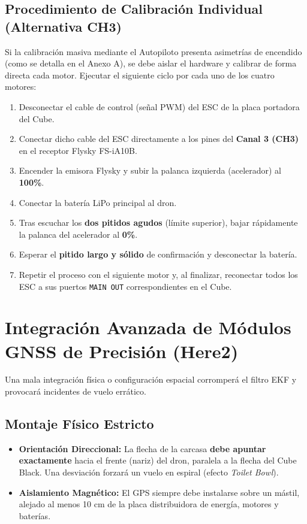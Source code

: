 \documentclass[12pt,a4paper]{article}
\begin{document}
\subsection{Procedimiento de Calibración Individual (Alternativa CH3)}
Si la calibración masiva mediante el Autopiloto presenta asimetrías de encendido (como se detalla en el Anexo A), se debe aislar el hardware y calibrar de forma directa cada motor. Ejecutar el siguiente ciclo por cada uno de los cuatro motores:
\begin{enumerate}[leftmargin=*]
    \item Desconectar el cable de control (señal PWM) del ESC de la placa portadora del Cube.
    \item Conectar dicho cable del ESC directamente a los pines del \textbf{Canal 3 (CH3)} en el receptor Flysky FS-iA10B.
    \item Encender la emisora Flysky y subir la palanca izquierda (acelerador) al \textbf{100\%}.
    \item Conectar la batería LiPo principal al dron.
    \item Tras escuchar los \textbf{dos pitidos agudos} (límite superior), bajar rápidamente la palanca del acelerador al \textbf{0\%}.
    \item Esperar el \textbf{pitido largo y sólido} de confirmación y desconectar la batería.
    \item Repetir el proceso con el siguiente motor y, al finalizar, reconectar todos los ESC a sus puertos \texttt{MAIN OUT} correspondientes en el Cube.
\end{enumerate}

\section{Integración Avanzada de Módulos GNSS de Precisión (Here2)}
Una mala integración física o configuración espacial corromperá el filtro EKF y provocará incidentes de vuelo errático.

\subsection{Montaje Físico Estricto}
\begin{itemize}[leftmargin=*]
    \item \textbf{Orientación Direccional:} La flecha de la carcasa \textbf{debe apuntar exactamente} hacia el frente (nariz) del dron, paralela a la flecha del Cube Black. Una desviación forzará un vuelo en espiral (efecto \textit{Toilet Bowl}).
    \item \textbf{Aislamiento Magnético:} El GPS siempre debe instalarse sobre un mástil, alejado al menos 10 cm de la placa distribuidora de energía, motores y baterías.
\end{itemize}
\end{document}

